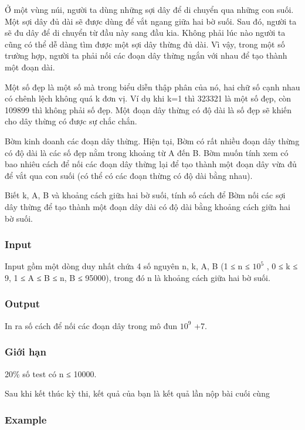 



   Ở một vùng núi, người ta dùng những sợi dây để di chuyển qua những con suối. Một sợi dây đủ dài sẽ được dùng để vắt ngang giữa hai bờ suối. Sau đó, người ta sẽ đu dây để di chuyển từ đầu này sang đầu kia. Không phải lúc nào người ta cũng có thể dễ dàng tìm được một sợi dây thừng đủ dài. Vì vậy, trong một số trường hợp, người ta phải nối các đoạn dây thừng ngắn với nhau để tạo thành một đoạn dài.  

   Một số đẹp là một số mà trong biểu diễn thập phân của nó, hai chữ số cạnh nhau có chênh lệch không quá k đơn vị. Ví dụ khi k=1 thì 323321 là một số đẹp, còn 109899 thì không phải số đẹp. Một đoạn dây thừng có độ dài là số đẹp sẽ khiến cho dây thừng có được sự chắc chắn.  

   Bờm kinh doanh các đoạn dây thừng. Hiện tại, Bờm có rất nhiều đoạn dây thừng có độ dài là các số đẹp nằm trong khoảng từ A đến B. Bờm muốn tính xem có bao nhiêu cách để nối các đoạn dây thừng lại để tạo thành một đoạn dây vừa đủ để vắt qua con suối (có thể có các đoạn thừng có độ dài bằng nhau).  

   Biết k, A, B và khoảng cách giữa hai bờ suối, tính số cách để Bờm nối các sợi dây thừng để tạo thành một đoạn dây dài có độ dài bằng khoảng cách giữa hai bờ suối.  

\subsubsection{   Input  }

   Input gồm một dòng duy nhất chứa 4 số nguyên n, k, A, B (1 ≤ n ≤ $10^{5}$   , 0 ≤ k ≤ 9, 1 ≤ A ≤ B ≤ n, B ≤ 95000), trong đó n là khoảng cách giữa hai bờ suối.  

\subsubsection{   Output  }

   In ra số cách để nối các đoạn dây trong mô đun $10^{9}$   +7.  

\subsubsection{   Giới hạn  }

   20\% số test có n ≤ 10000.  

     Sau khi kết thúc kỳ thi, kết quả của bạn là kết quả lần nộp bài cuối cùng    

\subsubsection{   Example  }

